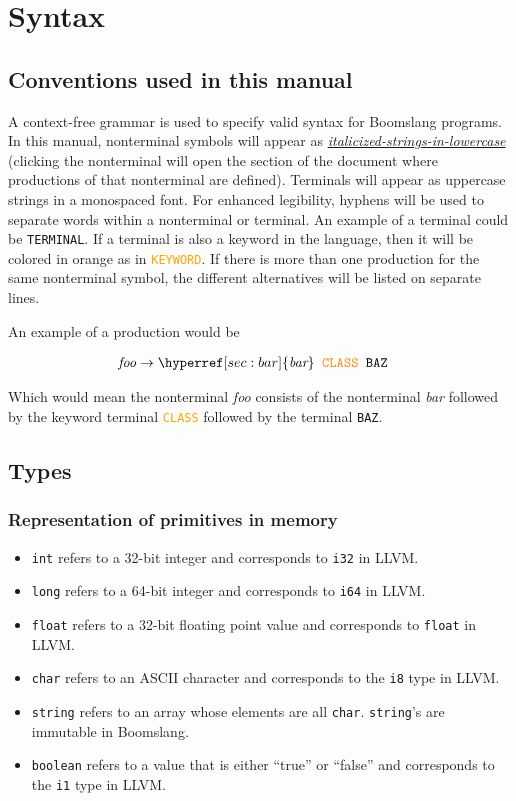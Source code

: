 \documentclass{article}
\begin{document}
\section{Syntax}
\subsection{Conventions used in this manual}
\label{sec:italicized-strings-in-lowercase}
\label{sec:bar}
A context-free grammar is used to specify valid syntax for Boomslang programs. In this manual, nonterminal symbols will appear as \hyperref[sec:italicized-strings-in-lowercase]{\textit{italicized-strings-in-lowercase}} (clicking the nonterminal will open the section of the document where productions of that nonterminal are defined). Terminals will appear as uppercase strings in a monospaced font. For enhanced legibility, hyphens will be used to separate words within a nonterminal or terminal. An example of a terminal could be  \texttt{TERMINAL}. If a terminal is also a keyword in the language, then it will be colored in orange as in \textcolor{orange}{\texttt{KEYWORD}}. If there is more than one production for the same nonterminal symbol, the different alternatives will be listed on separate lines.

An example of a production would be

\begin{align*}
    \textit{foo} &\to \hyperref[sec:bar]{\textit{bar}} \texttt{ } \textcolor{orange}{\texttt{CLASS}} \texttt{ } \texttt{BAZ}
\end{align*}

Which would mean the nonterminal \textit{foo} consists of the nonterminal \textit{bar} followed by the keyword terminal \textcolor{orange}{\texttt{CLASS}} followed by the terminal \texttt{BAZ}.

\subsection{Types}
\subsubsection{Representation of primitives in memory}
\begin{itemize}
    \item \texttt{int} refers to a 32-bit integer and corresponds to \texttt{i32} in LLVM.
    \item \texttt{long} refers to a 64-bit integer and corresponds to \texttt{i64} in LLVM.
    \item \texttt{float} refers to a 32-bit floating point value and corresponds to \texttt{float} in LLVM.
    \item \texttt{char} refers to an ASCII character and corresponds to the \texttt{i8} type in LLVM.
    \item \texttt{string} refers to an array whose elements are all \texttt{char}. \texttt{string}'s are immutable in Boomslang.
    \item \texttt{boolean} refers to a value that is either ``true'' or ``false'' and corresponds to the \texttt{i1} type in LLVM.
\end{itemize}
\end{document}
